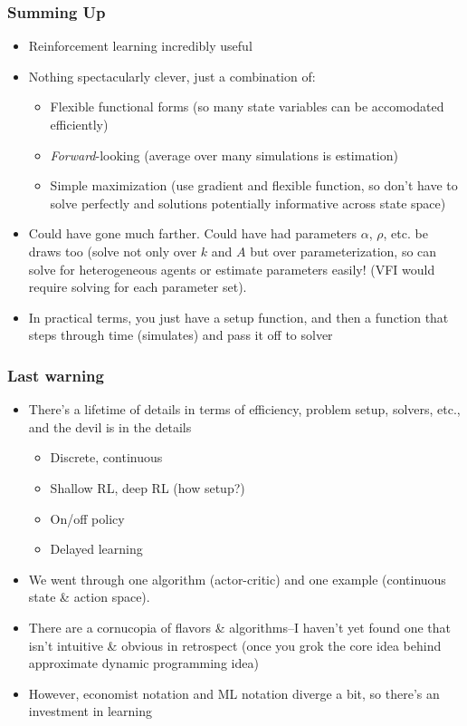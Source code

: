 \documentclass{beamer}
\begin{document}
\begin{frame}
\frametitle[alignment=center]{Summing Up}
\begin{itemize}
\item Reinforcement learning incredibly useful
\bigskip
\item Nothing spectacularly clever, just a combination of:
\begin{itemize}
\item Flexible functional forms (so many state variables can be accomodated efficiently)
\item \emph{Forward}-looking (average over many simulations is estimation)
\item Simple maximization (use gradient and flexible function, so don't have to solve perfectly and solutions potentially informative across state space)
\end{itemize}
\item Could have gone much farther.  Could have had parameters $\alpha$, $\rho$, etc. be draws too (solve not only over $k$ and $A$ but over parameterization, so can solve for heterogeneous agents or estimate parameters easily! (VFI would require solving for each parameter set).  
\bigskip
\item In practical terms, you just have a setup function, and then a function that steps through time (simulates) and pass it off to solver
\end{itemize}
\end{frame}


\begin{frame}
\frametitle[alignment=center]{Last warning}
\begin{itemize}
\item There's a lifetime of details in terms of efficiency, problem setup, solvers, etc., and the devil is in the details
\begin{itemize}
\item Discrete, continuous
\item Shallow RL, deep RL (how setup?)
\item On/off policy
\item Delayed learning
\end{itemize}
\bigskip
\item We went through one algorithm (actor-critic) and one example (continuous state \& action space).  
\bigskip
\item There are a cornucopia of flavors \& algorithms--I haven't yet found one that isn't intuitive \& obvious in retrospect (once you grok the core idea behind approximate dynamic programming idea)
\bigskip
\item However, economist notation and ML notation diverge a bit, so there's an investment in learning
\end{itemize}
\end{frame}
\end{document}
